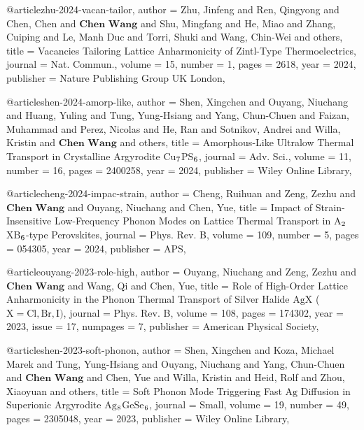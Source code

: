 @article{zhu-2024-vacan-tailor,
  author =	 {Zhu, Jinfeng and Ren, Qingyong and Chen, Chen and $\textbf{Chen Wang}$ and Shu, Mingfang and He, Miao and Zhang,
                  Cuiping and Le, Manh Duc and Torri, Shuki and Wang, Chin-Wei and others},
  title =	 {Vacancies Tailoring Lattice Anharmonicity of Zintl-Type Thermoelectrics},
  journal =	 {Nat. Commun.},
  volume =	 15,
  number =	 1,
  pages =	 2618,
  year =	 2024,
  publisher =	 {Nature Publishing Group UK London},
}

@article{shen-2024-amorp-like,
  author =	 {Shen, Xingchen and Ouyang, Niuchang and Huang, Yuling and Tung, Yung-Hsiang and Yang, Chun-Chuen and
                  Faizan, Muhammad and Perez, Nicolas and He, Ran and Sotnikov, Andrei and Willa, Kristin and $\textbf{Chen Wang}$ and others},
  title =	 {Amorphous-Like Ultralow Thermal Transport in Crystalline Argyrodite $\mathrm{Cu}$$\textsubscript{7}$$\mathrm{PS}$$\textsubscript{6}$},
  journal =	 {Adv. Sci.},
  volume =	 11,
  number =	 16,
  pages =	 2400258,
  year =	 2024,
  publisher =	 {Wiley Online Library},
}

@article{cheng-2024-impac-strain,
  author =	 {Cheng, Ruihuan and Zeng, Zezhu and $\textbf{Chen Wang}$ and Ouyang, Niuchang and Chen, Yue},
  title =	 {Impact of Strain-Insensitive Low-Frequency Phonon Modes on Lattice Thermal Transport in $\mathrm{A}$$\textsubscript{2}$$\mathrm{XB}$$\textsubscript{6}$-type
                  Perovskites},
  journal =	 {Phys. Rev. B},
  volume =	 109,
  number =	 5,
  pages =	 054305,
  year =	 2024,
  publisher =	 {APS},
}

@article{ouyang-2023-role-high,
  author =	 {Ouyang, Niuchang and Zeng, Zezhu and $\textbf{Chen Wang}$ and Wang, Qi and Chen, Yue},
  title =	 {Role of High-Order Lattice Anharmonicity in the Phonon Thermal Transport of Silver Halide
                  $\mathrm{AgX}$ ($\mathrm{X}=\mathrm{Cl},\mathrm{Br},\mathrm{I})$},
  journal =	 {Phys. Rev. B},
  volume =	 108,
  pages =	 174302,
  year =	 2023,
  issue =	 17,
  numpages =	 7,
  publisher =	 {American Physical Society},
}

@article{shen-2023-soft-phonon,
  author =	 {Shen, Xingchen and Koza, Michael Marek and Tung, Yung-Hsiang and Ouyang, Niuchang and Yang, Chun-Chuen
                  and $\textbf{Chen Wang}$ and Chen, Yue and Willa, Kristin and Heid, Rolf and Zhou, Xiaoyuan and others},
  title =	 {Soft Phonon Mode Triggering Fast $\mathrm{Ag}$ Diffusion in Superionic Argyrodite $\mathrm{Ag}$$\textsubscript{8}$$\mathrm{GeSe}$$\textsubscript{6}$},
  journal =	 {Small},
  volume =	 19,
  number =	 49,
  pages =	 2305048,
  year =	 2023,
  publisher =	 {Wiley Online Library},
}

